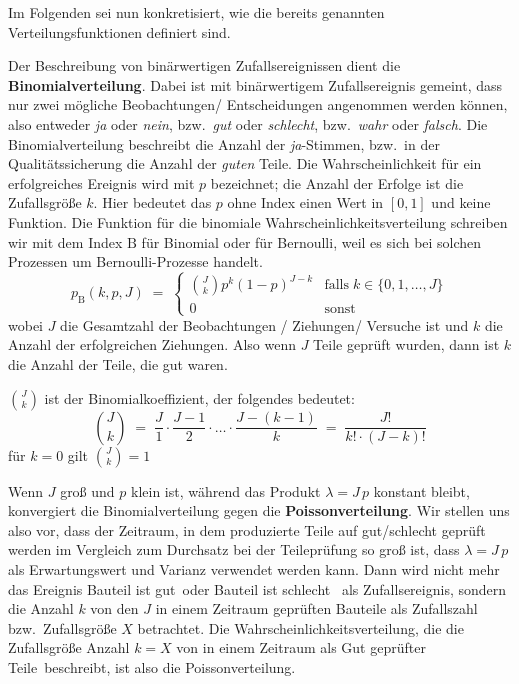 Im Folgenden sei nun konkretisiert, wie die bereits genannten Verteilungsfunktionen definiert sind.

Der Beschreibung von binärwertigen Zufallsereignissen dient die \textbf{Binomialverteilung}.
Dabei ist mit binärwertigem Zufallsereignis gemeint, dass nur zwei mögliche
Beobachtungen/ Entscheidungen angenommen werden können, also entweder \textsl{ja} oder \textsl{nein},
bzw.\ \textsl{gut} oder \textsl{schlecht},
bzw.\ \textsl{wahr} oder \textsl{falsch}. Die Binomialverteilung beschreibt die Anzahl der
\textsl{ja}-Stimmen, bzw.\ in der Qualitätssicherung die Anzahl der \textsl{guten} Teile.
Die Wahrscheinlichkeit für ein erfolgreiches Ereignis wird mit $p$ bezeichnet; die Anzahl
der Erfolge ist die Zufallsgröße $k$. Hier bedeutet das $p$ ohne Index einen Wert in
$[0,1]$ und keine Funktion.
Die Funktion für die binomiale Wahrscheinlichkeitsverteilung schreiben wir mit dem Index $\mathrm{B}$ für
Binomial oder für Bernoulli, weil es sich bei solchen Prozessen um Bernoulli-Prozesse handelt.
\begin{equation}
p_\mathrm{B}(k, p, J) \; = \;
\left\{ \begin{array}{ll}
\binom{J}{k} p^k \left(1 - p\right)^{J - k} & \text{falls} \; k \in \{0, 1, \dots, J\}\\
0 & \text{sonst}
\end{array}\right.
\end{equation}
wobei $J$ die Gesamtzahl der Beobachtungen / Ziehungen/ Versuche ist und $k$ die Anzahl der
erfolgreichen Ziehungen. Also wenn $J$ Teile geprüft wurden, dann ist $k$ die Anzahl der Teile,
die gut waren.

$\binom{J}{k}$ ist der Binomialkoeffizient, der folgendes bedeutet:
$$
\binom{J}{k} \; = \; \frac{J}{1} \cdot \frac{J-1}{2} \cdot
  \dots \cdot \frac{J- (k-1)}{k} \; = \;
  \frac{J!}{k! \cdot (J - k)!}
$$
für $k = 0$ gilt $\binom{J}{k} = 1$


Wenn $J$ groß und $p$ klein ist, während das Produkt $\lambda=J \, p$ konstant bleibt, konvergiert die
Binomialverteilung gegen die \textbf{Poissonverteilung}.
Wir stellen uns also vor, dass der Zeitraum, in dem produzierte Teile auf gut/schlecht geprüft werden im
Vergleich zum Durchsatz bei der Teileprüfung so groß ist, dass $\lambda = J \, p$ als Erwartungswert und Varianz
verwendet werden kann. Dann wird nicht mehr das Ereignis \glqq Bauteil ist gut\grqq ~oder \glqq Bauteil ist schlecht\grqq
~als Zufallsereignis, sondern die Anzahl $k$ von den $J$ in einem Zeitraum geprüften Bauteile als
Zufallszahl bzw.\ Zufallsgröße $X$ betrachtet. Die Wahrscheinlichkeitsverteilung, die die Zufallsgröße
\glqq Anzahl $k = X$ von in einem Zeitraum als Gut geprüfter Teile\grqq ~beschreibt, ist also die Poissonverteilung.

